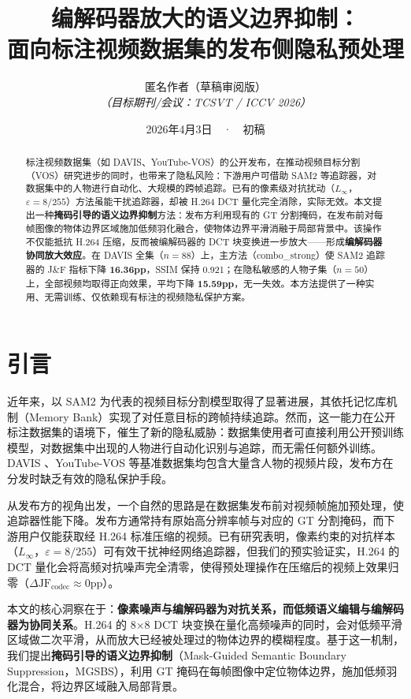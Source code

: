 \documentclass[UTF8,a4paper,12pt]{ctexart}
\title{\textbf{编解码器放大的语义边界抑制：\\
面向标注视频数据集的发布侧隐私预处理}}
\author{
  匿名作者（草稿审阅版）\\
  \textit{（目标期刊/会议：TCSVT / ICCV 2026）}
}
\date{2026年4月3日~~·~~初稿}
\begin{document}
\maketitle

\begin{abstract}
标注视频数据集（如 DAVIS、YouTube-VOS）的公开发布，在推动视频目标分割（VOS）研究进步的同时，也带来了隐私风险：下游用户可借助 SAM2 等追踪器，对数据集中的人物进行自动化、大规模的跨帧追踪。已有的像素级对抗扰动（$L_\infty$，$\varepsilon=8/255$）方法虽能干扰追踪器，却被 H.264 DCT 量化完全消除，实际无效。本文提出一种\textbf{掩码引导的语义边界抑制}方法：发布方利用现有的 GT 分割掩码，在发布前对每帧图像的物体边界区域施加低频羽化融合，使物体边界平滑消融于局部背景中。该操作不仅能抵抗 H.264 压缩，反而被编解码器的 DCT 块变换进一步放大——形成\textbf{编解码器协同放大效应}。在 DAVIS 全集（$n=88$）上，主方法（combo\_strong）使 SAM2 追踪器的 J\&F 指标下降 \textbf{16.36pp}，SSIM 保持 0.921；在隐私敏感的人物子集（$n=50$）上，全部视频均取得正向效果，平均下降 \textbf{15.59pp}，无一失效。本方法提供了一种实用、无需训练、仅依赖现有标注的视频隐私保护方案。
\end{abstract}

\tableofcontents
\clearpage

\section{引言}
\label{sec:intro}

近年来，以 SAM2 \cite{ravi2024sam2} 为代表的视频目标分割模型取得了显著进展，其依托记忆库机制（Memory Bank）实现了对任意目标的跨帧持续追踪。然而，这一能力在公开标注数据集的语境下，催生了新的隐私威胁：数据集使用者可直接利用公开预训练模型，对数据集中出现的人物进行自动化识别与追踪，而无需任何额外训练。DAVIS \cite{pont20162016}、YouTube-VOS \cite{xu2018youtube} 等基准数据集均包含大量含人物的视频片段，发布方在分发时缺乏有效的隐私保护手段。

从发布方的视角出发，一个自然的思路是在数据集发布前对视频帧施加预处理，使追踪器性能下降。发布方通常持有原始高分辨率帧与对应的 GT 分割掩码，而下游用户仅能获取经 H.264 标准压缩的视频。已有研究表明，像素约束的对抗样本（$L_\infty$，$\varepsilon = 8/255$）可有效干扰神经网络追踪器，但我们的预实验证实，H.264 的 DCT 量化会将高频对抗噪声完全清零，使得预处理操作在压缩后的视频上效果归零（$\Delta\text{JF}_{\text{codec}} \approx 0\text{pp}$）。

本文的核心洞察在于：\textbf{像素噪声与编解码器为对抗关系，而低频语义编辑与编解码器为协同关系}。H.264 的 8×8 DCT 块变换在量化高频噪声的同时，会对低频平滑区域做二次平滑，从而放大已经被处理过的物体边界的模糊程度。基于这一机制，我们提出\textbf{掩码引导的语义边界抑制}（Mask-Guided Semantic Boundary Suppression，MGSBS），利用 GT 掩码在每帧图像中定位物体边界，施加低频羽化混合，将边界区域融入局部背景。
\end{document}
